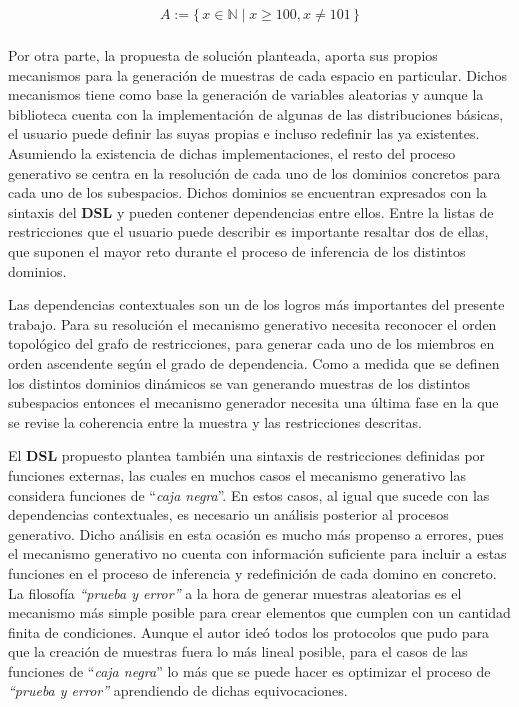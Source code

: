 \newcommand\Set[2]{\{\,#1\mid#2\,\}}
\newcommand\SET[2]{\Set{#1}{\text{#2}}}

\begin{align*}
    A := \Set{x \in \mathbb{N}}{x \ge 100, x \neq 101} \\
\end{align*}

Por otra parte, la propuesta de solución planteada, aporta sus propios mecanismos para la
generación de muestras de cada espacio en particular. Dichos mecanismos tiene como base la
generación de variables aleatorias y aunque la biblioteca cuenta con la implementación de
algunas de las distribuciones básicas, el usuario puede definir las suyas propias e incluso
redefinir las ya existentes. Asumiendo la existencia de dichas implementaciones, el resto del
proceso generativo se centra en la resolución de cada uno de los dominios concretos para cada
uno de los subespacios. Dichos dominios se encuentran expresados con la sintaxis del {\bf DSL}
y pueden contener dependencias entre ellos. Entre la listas de restricciones que el usuario puede
describir es importante resaltar dos de ellas, que suponen el mayor reto durante el proceso de
inferencia de los distintos dominios.

Las dependencias contextuales son un de los logros más importantes del presente trabajo. Para
su resolución el mecanismo generativo necesita reconocer el orden topológico del grafo de
restricciones, para generar cada uno de los miembros en orden ascendente según el grado de
dependencia. Como a medida que se definen los distintos dominios dinámicos se van generando
muestras de los distintos subespacios entonces el mecanismo generador necesita una última fase
en la que se revise la coherencia entre la muestra y las restricciones descritas.

El {\bf DSL} propuesto plantea también una sintaxis de restricciones definidas por funciones
externas, las cuales en muchos casos el mecanismo generativo las considera funciones
de ``{\it caja negra}''. En estos casos, al igual que sucede con las dependencias contextuales, es
necesario un análisis posterior al procesos generativo. Dicho análisis en esta ocasión es
mucho más propenso a errores, pues el mecanismo generativo no cuenta con información suficiente
para incluir a estas funciones en el proceso de inferencia y redefinición de cada domino en
concreto. La filosofía {\it “prueba y error”} a la hora de generar muestras aleatorias es el
mecanismo más simple posible para crear elementos que cumplen con un cantidad finita de condiciones.
Aunque el autor ideó todos los protocolos que pudo para que la creación de muestras fuera lo más
lineal posible, para el casos de las funciones de ``{\it caja negra}'' lo más que se puede hacer es
optimizar el proceso de {\it “prueba y error”} aprendiendo de dichas equivocaciones.


